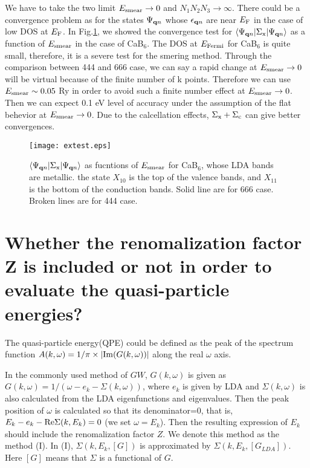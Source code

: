\documentclass[a4paper,10pt,epsf,fleqn]{article}
\begin{document}
We have to take the two limit $E_{\rm smear} \to 0$ and
$N_1N_2N_3\to \infty$.
There could be a convergence problem as for
the states $\Psi_{{\bf q}n}$ whose $\epsilon_{{\bf q} n}$
are near $E_{\rm F}$ in the case of low DOS at $E_{\rm F}$.
In Fig.\ref{extestcab6}, we showed
the convergence test
for $\langle \Psi_{{\bf q}n}|\Sigma_{\rm x} |\Psi_{{\bf q}n} \rangle$
as a function of $E_{\rm smear}$ in the case of CaB$_6$.
The DOS at $E_{\rm Fermi}$ for CaB$_6$ is quite small, therefore,
it is a severe test for the smering method.
Through the comparison between 444 and 666 case, 
we can say a rapid change at $E_{\rm smear}\to 0$ will be
virtual because of the finite number of k points.
Therefore we can use $E_{\rm smear} \sim 0.05$ Ry
in order to avoid such a finite number effect at $E_{\rm smear}\to 0$.
Then we can expect 0.1 eV level of accuracy under the assumption of the flat
behevior at $E_{\rm smear}\to 0$.
Due to the calcellation effects, $\Sigma_{\rm x} + \Sigma_{\rm c}$ can
give better convergences.
\begin{figure}
\texttt{[image: extest.eps]}
\caption[]{$\langle \Psi_{{\bf q}n}|\Sigma_{\rm x} |\Psi_{{\bf q}n} \rangle$
as fucntions of $E_{\rm smear}$ for CaB$_6$, whose LDA bands are metallic.
the state $X_{10}$ is the top of the valence bands, and $X_{11}$ is the
bottom of the conduction bands. Solid line are for 666 case.
Broken lines are for 444 case. }
\label{extestcab6}
\end{figure}



\newpage
\section{Whether the renomalization factor
Z is included or not in order to evaluate the quasi-particle energies?}
\label{zeq1ornot}

The quasi-particle energy(QPE) could be defined as the peak of
the spectrum function
$A(k,\omega)=  1/\pi \times |{\rm Im} ( G(k,\omega) ) |$ 
along the real $\omega$ axis.

In the commonly used method of $GW$, $G(k,\omega)$ is given as
$G(k,\omega) = 1/( \omega- e_k - \Sigma(k,\omega) )$,
where $e_k$ is given by LDA and $\Sigma(k,\omega)$ 
is also calculated from the LDA eigenfunctions and eigenvalues.
Then the peak position of $\omega $ is calculated so that its 
denominator=0, that is, $E_k - e_k - {\rm Re}\Sigma(k,E_k) =0$ (we set $\omega=E_k$).
Then the resulting expression of $E_k$ 
should include the renomalization factor $Z$.
We denote this method as the method (I). In (I), $\Sigma(k, E_k, [G])$
is approximated by $\Sigma(k, E_k, [G_{LDA}])$.
Here $[G]$ means that $\Sigma$ is a functional of $G$.
\end{document}
